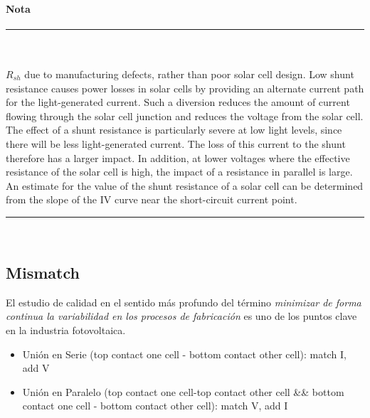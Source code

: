 {\paragraph{Nota}	
	{\rule{0.9\textwidth}{1pt} \\\\
	 $ R_{sh} $ due to manufacturing defects, rather than poor solar cell design. Low shunt resistance causes power losses in solar cells by providing an alternate current path for the light-generated current. Such a diversion reduces the amount of current flowing through the solar cell junction and reduces the voltage from the solar cell. The effect of a shunt resistance is particularly severe at low light levels, since there will be less light-generated current. The loss of this current to the shunt therefore has a larger impact. In addition, at lower voltages where the effective resistance of the solar cell is high, the impact of a resistance in parallel is large. An estimate for the value of the shunt resistance of a solar cell can be determined from the slope of the IV curve near the short-circuit current point.\\
		\rule{0.99\textwidth}{1pt}\\}}

\subsection{Mismatch}
El estudio de calidad en el sentido más profundo del término {\em minimizar de forma continua la variabilidad en los procesos de fabricación} es uno de los puntos clave en la industria fotovoltaica.
\begin{itemize}
	\item Unión en Serie (top contact one cell - bottom contact other cell): match I, add V
	\item Unión en Paralelo (top contact one cell-top contact other cell \&\& bottom contact one cell - bottom contact other cell): match V, add I
\end{itemize}